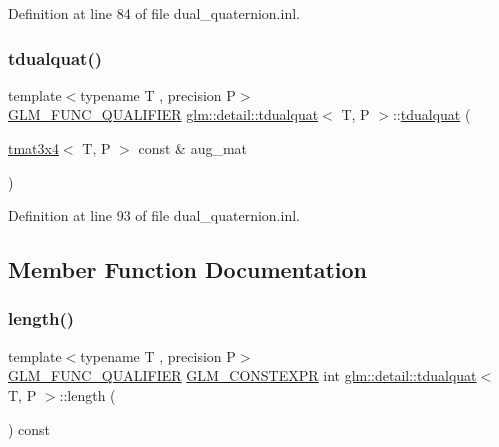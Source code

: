 Definition at line 84 of file dual\+\_\+quaternion.\+inl.

\mbox{\label{structglm_1_1detail_1_1tdualquat_afd1ddf2aeffe1f900dfbc17507860e89}} 
\subsubsection{\texorpdfstring{tdualquat()}{tdualquat()}\hspace{0.1cm}{\footnotesize\ttfamily [6/6]}}
{\footnotesize\ttfamily template$<$typename T , precision P$>$ \\
\hyperlink{setup_8hpp_a33fdea6f91c5f834105f7415e2a64407}{G\+L\+M\+\_\+\+F\+U\+N\+C\+\_\+\+Q\+U\+A\+L\+I\+F\+I\+ER} \hyperlink{structglm_1_1detail_1_1tdualquat}{glm\+::detail\+::tdualquat}$<$ T, P $>$\+::\hyperlink{structglm_1_1detail_1_1tdualquat}{tdualquat} (\begin{DoxyParamCaption}\item[{\hyperlink{structglm_1_1detail_1_1tmat3x4}{tmat3x4}$<$ T, P $>$ const \&}]{aug\+\_\+mat }\end{DoxyParamCaption})\hspace{0.3cm}{\ttfamily [explicit]}}



Definition at line 93 of file dual\+\_\+quaternion.\+inl.



\subsection{Member Function Documentation}
\mbox{\label{structglm_1_1detail_1_1tdualquat_a07e4d1cc692516c4cc15dd2e39ae3252}} 
\subsubsection{\texorpdfstring{length()}{length()}}
{\footnotesize\ttfamily template$<$typename T , precision P$>$ \\
\hyperlink{setup_8hpp_a33fdea6f91c5f834105f7415e2a64407}{G\+L\+M\+\_\+\+F\+U\+N\+C\+\_\+\+Q\+U\+A\+L\+I\+F\+I\+ER} \hyperlink{setup_8hpp_a08b807947b47031d3a511f03f89645ad}{G\+L\+M\+\_\+\+C\+O\+N\+S\+T\+E\+X\+PR} int \hyperlink{structglm_1_1detail_1_1tdualquat}{glm\+::detail\+::tdualquat}$<$ T, P $>$\+::length (\begin{DoxyParamCaption}{ }\end{DoxyParamCaption}) const}



